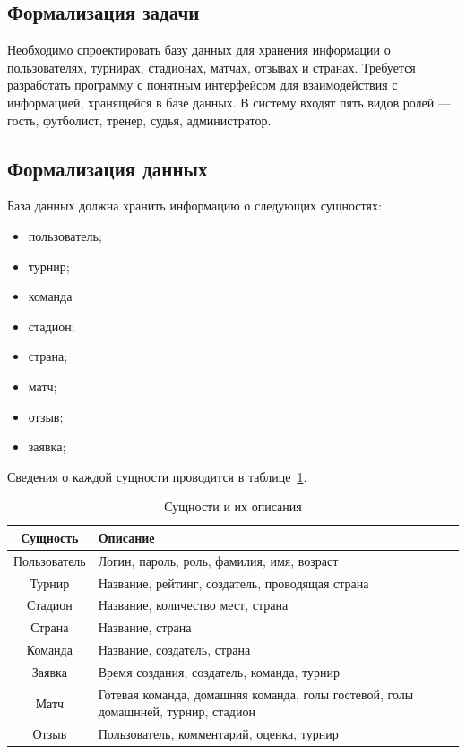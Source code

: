 \subsection{Формализация задачи}

Необходимо спроектировать базу данных для хранения информации о пользователях, турнирах, стадионах, матчах, отзывах и странах.
Требуется разработать программу с понятным интерфейсом для взаимодействия с информацией, хранящейся в базе данных.
В систему входят пять видов ролей --- гость, футболист, тренер, судья, администратор. 

\subsection{Формализация данных}

База данных должна хранить информацию о следующих сущностях:
\begin{itemize}
	\item пользователь;
	\item турнир;
	\item команда
	\item стадион;
	\item страна;
	\item матч;
	\item отзыв;
	\item заявка;
\end{itemize}

Сведения о каждой сущности проводится в таблице~\ref{tb:data}.

\begin{table}[ht]
	\begin{center}
		\begin{threeparttable}
			\caption{\label{tb:data} Сущности и их описания}
			\begin{tabular}{|c|p{10cm}|}
				\hline
				\textbf{Сущность} & \textbf{Описание} \\ \hline
				Пользователь & Логин, пароль, роль, фамилия, имя, возраст \\ \hline
				Турнир & Название, рейтинг, создатель, проводящая страна \\ \hline
				Стадион & Название, количество мест, страна \\ \hline
				Страна & Название, страна \\ \hline
				Команда & Название, создатель, страна \\ \hline
				Заявка & Время создания, создатель, команда, турнир \\ \hline
				Матч & Готевая команда, домашняя команда, голы гостевой, голы домашнней, турнир, стадион \\ \hline
				Отзыв & Пользователь, комментарий, оценка, турнир \\ \hline
			\end{tabular}
		\end{threeparttable}
	\end{center}
\end{table}

